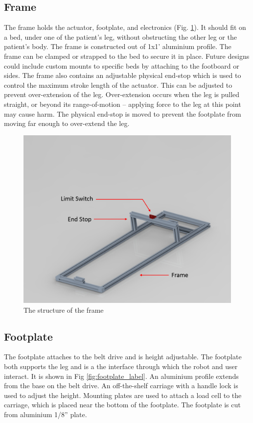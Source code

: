 \documentclass[12pt]{report}
\begin{document}
	\subsection{Frame}

	The frame holds the actuator, footplate, and electronics (Fig. \ref{fig:frame}). It should fit on a bed, under one of the patient's leg, without obstructing the other leg or the patient's body. The frame is constructed out of 1x1' aluminium profile. The frame can be clamped or strapped to the bed to secure it in place. Future designs could include custom mounts to specific beds by attaching to the footboard or sides. The frame also contains an adjustable physical end-stop which is used to control the maximum stroke length of the actuator. This can be adjusted to prevent over-extension of the leg. Over-extension occurs when the leg is pulled straight, or beyond its range-of-motion -- applying force to the leg at this point may cause harm. The physical end-stop is moved to prevent the footplate from moving far enough to over-extend the leg. 
	

	\begin{figure}[h] 
		\centering
		\includegraphics[width=0.75\linewidth]{frame}
		\caption{The structure of the frame}
		\label{fig:frame}
	\end{figure}
	
	
	
	\subsection{Footplate}
	
	The footplate attaches to the belt drive and is height adjustable. The footplate both supports the leg and is a the interface through which the robot and user interact. It is shown in Fig \ref{fig:footplate_label}. An aluminium profile extends from the base on the belt drive. An off-the-shelf carriage with a handle lock is used to adjust the height. Mounting plates are used to attach a load cell to the carriage, which is placed near the bottom of the footplate. The footplate is cut from aluminium 1/8'' plate. 
	
\end{document}
